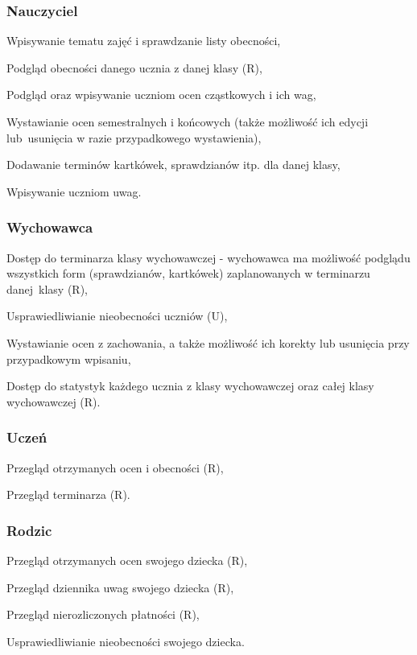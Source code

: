 \documentclass[12pt]{article}
\begin{document}
\subsubsection{Nauczyciel}
\begin{itemize*}
    \item Wpisywanie tematu zajęć i sprawdzanie listy obecności,
    \item Podgląd obecności danego ucznia z danej klasy (R),
    \item Podgląd oraz wpisywanie uczniom ocen cząstkowych i ich wag,
    \item Wystawianie ocen semestralnych i końcowych (także możliwość ich edycji lub~usunięcia w razie przypadkowego wystawienia),
    \item Dodawanie terminów kartkówek, sprawdzianów itp. dla danej klasy,
    \item Wpisywanie uczniom uwag.

\end{itemize*}
\subsubsection{Wychowawca}
\begin{itemize*}
    \item Dostęp do terminarza klasy wychowawczej - wychowawca ma możliwość podglądu wszystkich form (sprawdzianów, kartkówek) zaplanowanych w terminarzu danej~klasy (R),
    \item Usprawiedliwianie nieobecności uczniów (U),
    \item Wystawianie ocen z zachowania, a także możliwość ich korekty lub usunięcia przy przypadkowym wpisaniu,
    \item Dostęp do statystyk każdego ucznia z klasy wychowawczej oraz całej klasy wychowawczej (R).
\end{itemize*}

\subsubsection{Uczeń}
\begin{itemize*}
    \item Przegląd otrzymanych ocen i obecności (R),
    \item Przegląd terminarza (R).
\end{itemize*}
\subsubsection{Rodzic}
\begin{itemize*}
    \item Przegląd otrzymanych ocen swojego dziecka (R),
    \item Przegląd dziennika uwag swojego dziecka (R),
    \item Przegląd nierozliczonych płatności (R),
    \item Usprawiedliwianie nieobecności swojego dziecka.
\end{itemize*}
\end{document}
